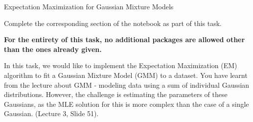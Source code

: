 \documentclass[
	english,
        solution=true
	]{tudaexercise}
\begin{document}
\begin{task}[points=6 + 4]{Expectation Maximization for Gaussian Mixture Models}
\begin{programmingtaskbox}
Complete the corresponding section of the notebook as part of this task.
\end{programmingtaskbox}

\textbf{For the entirety of this task, no additional packages are allowed other than the ones already given.}


In this task, we would like to implement the Expectation Maximization (EM) algorithm to fit a Gaussian Mixture Model (GMM) to a dataset. You have learnt from the lecture about GMM - modeling data using a sum of individual Gaussian distributions. However, the challenge is estimating the parameters of these Gaussians, as the MLE solution for this is more complex than the case of a single Gaussian. (Lecture 3, Slide 51). 


\end{task}
\end{document}
